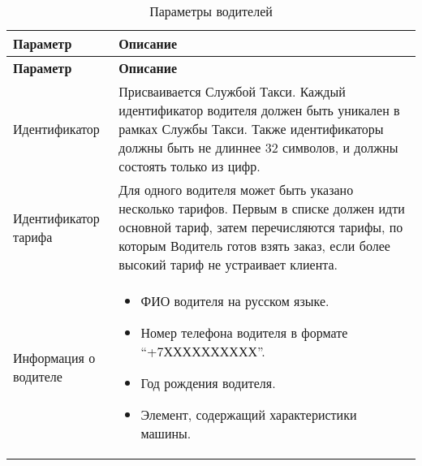 			\setlength{\extrarowheight}{2mm}
				\begin{longtable}{|p{4cm}|p{9cm}|}
					\caption {Параметры водителей}\\

				    \hline	\textbf{Параметр}&\textbf{Описание} \\ [2mm]
				    \endfirsthead
				    \hline	\textbf{Параметр}&\textbf{Описание} \\ [2mm]
				    \endhead

					\hline	Идентификатор &  Присваивается Службой Такси. Каждый идентификатор водителя должен быть уникален в рамках Службы Такси. Также идентификаторы должны быть не длиннее 32 символов, и должны состоять только из цифр. \\ [2mm]

				    \hline	Идентификатор тарифа & Для одного водителя может быть указано несколько тарифов. Первым в списке должен идти основной тариф, затем перечисляются тарифы, по которым Водитель готов взять заказ, если более высокий тариф не устраивает клиента. \\ [2mm]

					\hline	Информация о водителе & \begin{itemize} 
														\item ФИО водителя на русском языке.
														\item Номер телефона водителя в формате “+7ХХХХХХХХХХ”.
														\item Год рождения водителя.
														\item Элемент, содержащий характеристики машины.
													\end{itemize} \\ [2mm]


\end{longtable}
